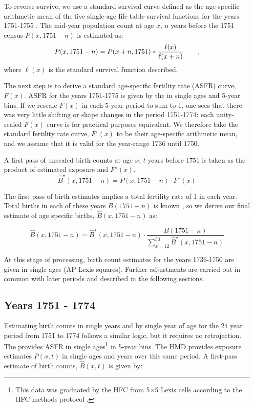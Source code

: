 To reverse-survive, we use a standard survival curve defined as the age-specific arithmetic mean of the five single-age life table survival functions for the years 1751-1755 \citep{HMD}. The mid-year population count at age $x$, $n$ years before the 1751 census $P(x,1751-n)$ is estimated as:
		\begin{equation}
\label{eq:Pxhat}
P(x,1751-n) = P(x+n,1751) * \frac{\ell(x)}{\ell(x+n)} \quad\quad\text{,}
\end{equation}
where $\ell(x)$ is the standard survival function described.

The next step is to derive a standard age-specific fertility rate (ASFR) curve, $F(x)$. ASFR for the years 1751-1775 is given by the \citet{HFC} in single ages and 5-year bins. If we rescale $F(x)$ in each 5-year period to sum to 1, one sees that there was very little shifting or shape changes in the period 1751-1774: each unity-scaled $F(x)$ curve is for practical purposes equivalent. We therefore take the standard fertility rate curve, $F^\star(x)$ to be their age-specific arithmetic mean, and we assume that it is valid for the year-range 1736 until 1750.

A first pass of unscaled birth counts at age $x$, $t$ years before 1751 is taken as the product of estimated exposure and $F^\star(x)$.
\begin{equation}
\widehat{B}^\star(x,1751-n) = P(x,1751-n) \cdot F^\star(x)
\end{equation}

The first pass of birth estimates implies a total fertility rate of 1 in each year. Total births in each of these years $B(1751-n)$ is known \citep[][Tab.~27 \& Tab.~28]{sweden1969historisk}, so we derive our final estimate of age specific births, $\widehat{B}(x,1751-n)$ as:
		
		\begin{equation}
\widehat{B}(x,1751-n) = \widehat{B}^\star(x,1751-n) \cdot \frac{B(1751-n)}{\sum _{x=12}^{50}\widehat{B}^\star(x,1751-n) }
\end{equation}

At this stage of processing, birth count estimates for the years 1736-1750 are given in single ages (AP Lexis squares). Further adjustments are carried out in common with later periods and described in the following sections.

\subsection{Years 1751 - 1774}
\label{sec:hfc}
Estimating birth counts in single years and by single year of age for the 24 year period from 1751 to 1774 follows a similar logic, but it requires no retrojection. The \citet{HFC} provides ASFR in single ages\footnote{This data was graduated by the HFC from 5$\times$5 Lexis cells according to the HFC methods protocol \citep{grigorieva2015methods}.} in 5-year bins. The HMD provides exposure estimates $P(x,t)$ in single ages and years over this same period. A first-pass estimate of birth counts, $\widehat{B}(x,t)$ is given by:
		
